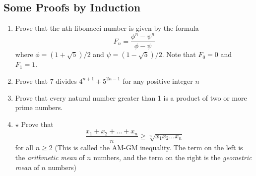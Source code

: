 \documentclass[12pt]{article}
\begin{document}
\subsection*{Some Proofs by Induction}

\begin{enumerate}[label=Q\arabic*.,resume]
    \item Prove that the nth fibonacci number is given by the formula $$F_n = \frac{\phi^n - \psi^n}{\phi - \psi}$$
        where $\phi = (1+\sqrt{5})/2$ and $\psi = (1-\sqrt{5})/2$. Note that 
        $F_0 = 0$ and $F_1 = 1$.

    \item Prove that 7 divides $4^{n+1} + 5^{2n-1}$ for any positive integer $n$

    \item Prove that every natural number greater than 1 is a product of two 
        or more prime numbers.
    
    \item $\star$ Prove that $$\frac{x_1 + x_2 + \ldots + x_n}{n} \ge \sqrt[n]{x_1x_2
        \ldots x_n}$$ for all $n \ge 2$ (This is called the AM-GM inequality. The 
        term on the left is the \emph{arithmetic mean} of $n$ numbers, and 
        the term on the right is the \emph{geometric mean} of $n$ numbers)

\end{enumerate}
\end{document}
